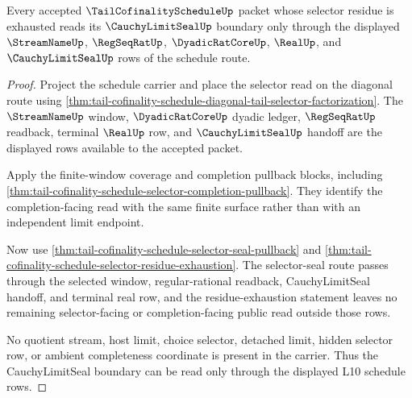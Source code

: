 \begin{theorem}
\label{thm:tail-cofinality-schedule-cauchy-limitseal-readback}
Every accepted $\TailCofinalityScheduleUp$ packet whose selector residue is exhausted reads its $\CauchyLimitSealUp$ boundary only through the displayed $\StreamNameUp$, $\RegSeqRatUp$, $\DyadicRatCoreUp$, $\RealUp$, and $\CauchyLimitSealUp$ rows of the schedule route.
\end{theorem}
\begin{proof}
Project the schedule carrier and place the selector read on the diagonal route using \autoref{thm:tail-cofinality-schedule-diagonal-tail-selector-factorization}. The $\StreamNameUp$ window, $\DyadicRatCoreUp$ dyadic ledger, $\RegSeqRatUp$ readback, terminal $\RealUp$ row, and $\CauchyLimitSealUp$ handoff are the displayed rows available to the accepted packet.

Apply the finite-window coverage and completion pullback blocks, including \autoref{thm:tail-cofinality-schedule-selector-completion-pullback}. They identify the completion-facing read with the same finite surface rather than with an independent limit endpoint.

Now use \autoref{thm:tail-cofinality-schedule-selector-seal-pullback} and \autoref{thm:tail-cofinality-schedule-selector-residue-exhaustion}. The selector-seal route passes through the selected window, regular-rational readback, CauchyLimitSeal handoff, and terminal real row, and the residue-exhaustion statement leaves no remaining selector-facing or completion-facing public read outside those rows.

No quotient stream, host limit, choice selector, detached limit, hidden selector row, or ambient completeness coordinate is present in the carrier. Thus the CauchyLimitSeal boundary can be read only through the displayed L10 schedule rows.
\end{proof}

